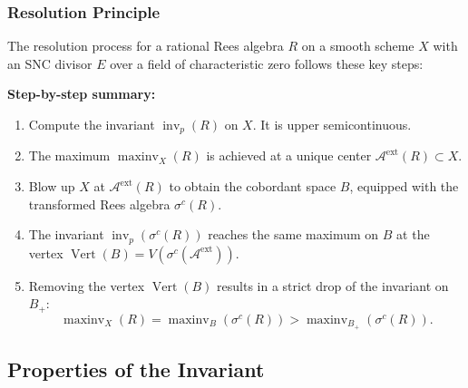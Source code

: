 \documentclass{amsart}
\newcommand{\cA}{{\mathcal A}}
\newcommand{\Ver}{{\operatorname{Vert}}}
\newcommand{\ext}{{\operatorname{ext}}}
\newcommand{\inv}{{\operatorname{inv}}}
\newcommand{\maxinv}{{\operatorname{maxinv}}}
\begin{document}
\subsubsection{Resolution Principle}

\noindent
The resolution process for a rational Rees algebra $R$ on a smooth scheme $X$ with an SNC divisor $E$ over a field of characteristic zero follows these key steps:

\begin{center}
\end{center}

\vspace{1em}

\noindent
\textbf{Step-by-step summary:}
\begin{enumerate}
    \item Compute the invariant $\inv_p(R)$ on $X$. It is upper semicontinuous.
    \item The maximum $\maxinv_X(R)$ is achieved at a unique center $\cA^{\ext}(R) \subset X$.
    \item Blow up $X$ at $\cA^{\ext}(R)$ to obtain the cobordant space $B$, equipped with the transformed Rees algebra $\sigma^c(R)$.
    \item The invariant $\inv_p(\sigma^c(R))$ reaches the same maximum on $B$ at the vertex $\Ver(B) = V(\sigma^c(\cA^{\ext}))$.
    \item Removing the vertex $\Ver(B)$ results in a strict drop of the invariant on $B_+$:
    \[
    \maxinv_X(R) = \maxinv_B(\sigma^c(R)) > \maxinv_{B_+}(\sigma^c(R)).
    \]
\end{enumerate}

\subsection{Properties of the Invariant} \label{prop}
\end{document}
